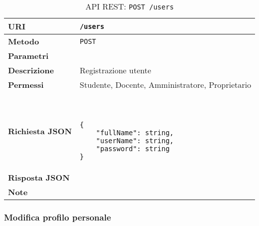         \begin{table}[H]
            \begin{center}
                \begin{tabular}{p{} p{}}
                    \toprule
                    \textbf{URI} & \texttt{/users} \\ \midrule
                    \textbf{Metodo} & \texttt{POST} \\ \midrule
                    \textbf{Parametri} & \\ \midrule
                    \textbf{Descrizione} & Registrazione utente \\ \midrule
                    \textbf{Permessi} & Studente, Docente, Amministratore, Proprietario  \\ \midrule
                    \textbf{Richiesta JSON} & \
                        \begin{lstlisting}[basicstyle={\ttfamily}]
{
    "fullName": string,
    "userName": string,
    "password": string
}
                        \end{lstlisting}
                        \\ \midrule
                    \textbf{Risposta JSON} & \\ \midrule
                    \textbf{Note} & \\
                    \bottomrule
                \end{tabular}
                \caption{API REST: \texttt{POST /users}}
            \end{center}
        \end{table}

    \subsubsection{Modifica profilo personale}

